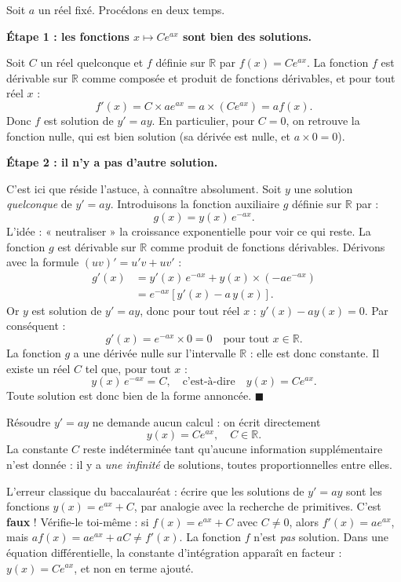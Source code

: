 \documentclass[11pt]{article}
\newcommand{\cle}[1]{{\popxbold\color{popdark}#1}}
\begin{document}
\begin{experience}
Soit $a$ un réel fixé. Procédons en deux temps.

\textbf{Étape 1 : les fonctions $x \mapsto Ce^{ax}$ sont bien des solutions.}

Soit $C$ un réel quelconque et $f$ définie sur $\mathbb{R}$ par $f(x) = Ce^{ax}$. La fonction $f$ est dérivable sur $\mathbb{R}$ comme composée et produit de fonctions dérivables, et pour tout réel $x$ :
\[ f'(x) = C \times a e^{ax} = a \times \left(C e^{ax}\right) = a f(x). \]
Donc $f$ est solution de $y' = ay$. En particulier, pour $C = 0$, on retrouve la \cle{fonction nulle}, qui est bien solution (sa dérivée est nulle, et $a \times 0 = 0$).

\textbf{Étape 2 : il n'y a pas d'autre solution.}

C'est ici que réside l'astuce, à connaître absolument. Soit $y$ une solution \emph{quelconque} de $y' = ay$. Introduisons la fonction auxiliaire $g$ définie sur $\mathbb{R}$ par :
\[ g(x) = y(x)\, e^{-ax}. \]
L'idée : « neutraliser » la croissance exponentielle pour voir ce qui reste. La fonction $g$ est dérivable sur $\mathbb{R}$ comme produit de fonctions dérivables. Dérivons avec la formule $(uv)' = u'v + uv'$ :
\begin{align*}
g'(x) &= y'(x)\, e^{-ax} + y(x) \times \left(-a e^{-ax}\right) \\
&= e^{-ax} \left[ y'(x) - a\, y(x) \right].
\end{align*}
Or $y$ est solution de $y' = ay$, donc pour tout réel $x$ : $y'(x) - a y(x) = 0$. Par conséquent :
\[ g'(x) = e^{-ax} \times 0 = 0 \quad \text{pour tout } x \in \mathbb{R}. \]
La fonction $g$ a une dérivée nulle sur l'intervalle $\mathbb{R}$ : elle est donc \cle{constante}. Il existe un réel $C$ tel que, pour tout $x$ :
\[ y(x)\, e^{-ax} = C, \quad \text{c'est-à-dire} \quad y(x) = C e^{ax}. \]
Toute solution est donc bien de la forme annoncée. $\blacksquare$
\end{experience}

\begin{aretenir}
Résoudre $y' = ay$ ne demande aucun calcul : on écrit directement
\[ y(x) = C e^{ax}, \quad C \in \mathbb{R}. \]
La constante $C$ reste indéterminée tant qu'aucune information supplémentaire n'est donnée : il y a \emph{une infinité} de solutions, toutes proportionnelles entre elles.
\end{aretenir}

\begin{attention}
L'erreur classique du baccalauréat : écrire que les solutions de $y' = ay$ sont les fonctions $y(x) = e^{ax} + C$, par analogie avec la recherche de primitives. C'est \textbf{faux} ! Vérifie-le toi-même : si $f(x) = e^{ax} + C$ avec $C \neq 0$, alors $f'(x) = a e^{ax}$, mais $a f(x) = a e^{ax} + aC \neq f'(x)$. La fonction $f$ n'est \emph{pas} solution. Dans une équation différentielle, la constante d'intégration apparaît en \cle{facteur} : $y(x) = C e^{ax}$, et non en terme ajouté.
\end{attention}
\end{document}
